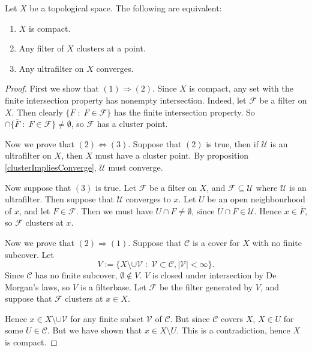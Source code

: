 \documentclass{owmaths}
\begin{document}
\begin{proposition}
    Let $X$ be a topological space. The following are equivalent:
    \begin{enumerate}
        \item{} $X$ is compact.
        \item{} Any filter of $X$ clusters at a point.
        \item{} Any ultrafilter on $X$ converges.
    \end{enumerate}
\end{proposition}
\begin{proof}
    First we show that $(1)\Rightarrow(2)$. Since $X$ is compact, any set
    with the finite intersection property has nonempty intersection. Indeed,
    let $\mathcal{F}$ be a filter on $X$. Then clearly $\{\overline{F}\;:\;F \in\mathcal{F}\}$
    has the finite intersection property. So $\cap\{\overline{F}\;:\;F \in\mathcal{F}\} \neq \emptyset$,
    so $\mathcal{F}$ has a cluster point.
    
    Now we prove that $(2)\Leftrightarrow(3)$. Suppose that $(2)$ is true,
    then if $\mathcal{U}$ is an ultrafilter on $X$, then $X$ must have a cluster
    point. By proposition \ref{clusterImpliesConverge}, $\mathcal{U}$
    must converge.
    
    Now suppose that $(3)$ is true. Let $\mathcal{F}$ be a filter on $X$,
    and $\mathcal{F} \subseteq \mathcal{U}$
    where $\mathcal{U}$ is an ultrafilter. Then suppose that $\mathcal{U}$
    converges to $x$. Let $U$ be an open neighbourhood of $x$, and let $F \in \mathcal{F}$.
    Then we must have $U\cap F \neq \emptyset$, since $U \cap F \in \mathcal{U}$. 
    Hence $x \in \overline{F}$, so $\mathcal{F}$ clusters at $x$.
    
    Now we prove that $(2)\Rightarrow(1)$. Suppose that $\mathcal{C}$ is a cover
    for $X$ with no finite subcover. Let
    \begin{equation*}
        V := \{X \setminus \cup \mathcal{V}\;:\;\mathcal{V} \subset \mathcal{C}, |\mathcal{V}| < \infty\}.
    \end{equation*}
    Since $\mathcal{C}$ has no finite subcover, $\emptyset \notin V$. $V$ is closed
    under intersection by De Morgan's laws, so $V$ is a filterbase. Let $\mathcal{F}$
    be the filter generated by $V$, and suppose that $\mathcal{F}$ clusters at $x \in X$. 
    
    Hence $x \in X \setminus \cup \mathcal{V}$ for any finite subset $\mathcal{V}$
    of $\mathcal{C}$. But since $\mathcal{C}$ covers $X$, $X \in U$ for some $U \in \mathcal{C}$.
    But we have shown that $x \in X\setminus U$. This is a contradiction,
    hence $X$ is compact.
    
\end{proof} 
\end{document}
